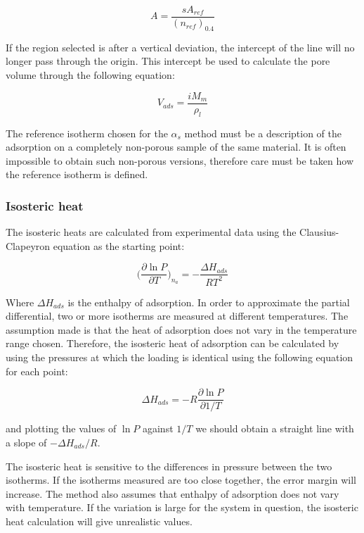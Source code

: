 \begin{equation}
	A = \frac{s A_{ref}}{(n_{ref})_{0.4}}
\end{equation}


If the region selected is after a vertical deviation, the intercept of the line
will no longer pass through the origin. This intercept be used to calculate the
pore volume through the following equation:

\begin{equation}
	V_{ads} = \frac{i M_m}{\rho_{l}}
\end{equation}


The reference isotherm chosen for the \(\alpha_s\) method must be a description
of the adsorption on a completely non-porous sample of the same material. It is
often impossible to obtain such non-porous versions, therefore care must be 
taken how the reference isotherm is defined.


\subsubsection{Isosteric heat}

The isosteric heats are calculated from experimental data using the Clausius-Clapeyron
equation as the starting point:

\begin{equation}
    \Big( \frac{\partial \ln P}{\partial T} \Big)_{n_a} = -\frac{\Delta H_{ads}}{R T^2}
\end{equation}

Where \(\Delta H_{ads}\) is the enthalpy of adsorption. In order to approximate the
partial differential, two or more isotherms are measured at different temperatures. The
assumption made is that the heat of adsorption does not vary in the temperature range
chosen. Therefore, the isosteric heat of adsorption can be calculated by using the pressures
at which the loading is identical using the following equation for each point:

\begin{equation}
    \Delta H_{ads} = - R \frac{\partial \ln P}{\partial 1 / T}
\end{equation}

and plotting the values of \(\ln P\) against \(1 / T\) we should obtain a straight
line with a slope of \(- \Delta H_{ads} / R\).

The isosteric heat is sensitive to the differences in pressure between the two isotherms. If
the isotherms measured are too close together, the error margin will increase.
The method also assumes that enthalpy of adsorption does not vary with temperature. If the
variation is large for the system in question, the isosteric heat calculation will give
unrealistic values.

